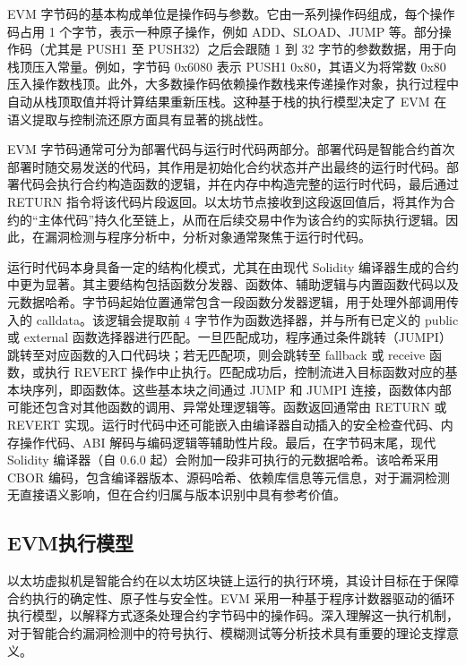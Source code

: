 \documentclass[print, master, vlined, timesmath]{DissertUESTC}
\begin{document}
EVM 字节码的基本构成单位是操作码与参数。它由一系列操作码组成，每个操作码占用 1 个字节，表示一种原子操作，例如 ADD、SLOAD、JUMP 等。部分操作码（尤其是 PUSH1 至 PUSH32）之后会跟随 1 到 32 字节的参数数据，用于向栈顶压入常量。例如，字节码 0x6080 表示 PUSH1 0x80，其语义为将常数 0x80 压入操作数栈顶。此外，大多数操作码依赖操作数栈来传递操作对象，执行过程中自动从栈顶取值并将计算结果重新压栈。这种基于栈的执行模型决定了 EVM 在语义提取与控制流还原方面具有显著的挑战性。

EVM 字节码通常可分为部署代码与运行时代码两部分\textsuperscript{\cite{albert2025secure}}。部署代码是智能合约首次部署时随交易发送的代码，其作用是初始化合约状态并产出最终的运行时代码。部署代码会执行合约构造函数的逻辑，并在内存中构造完整的运行时代码，最后通过 RETURN 指令将该代码片段返回。以太坊节点接收到这段返回值后，将其作为合约的“主体代码”持久化至链上，从而在后续交易中作为该合约的实际执行逻辑。因此，在漏洞检测与程序分析中，分析对象通常聚焦于运行时代码。

运行时代码本身具备一定的结构化模式，尤其在由现代 Solidity 编译器生成的合约中更为显著\textsuperscript{\cite{xiang2025automating}}。其主要结构包括函数分发器、函数体、辅助逻辑与内置函数代码以及元数据哈希。字节码起始位置通常包含一段函数分发器逻辑，用于处理外部调用传入的 calldata。该逻辑会提取前 4 字节作为函数选择器，并与所有已定义的 public 或 external 函数选择器进行匹配。一旦匹配成功，程序通过条件跳转（JUMPI）跳转至对应函数的入口代码块；若无匹配项，则会跳转至 fallback 或 receive 函数，或执行 REVERT 操作中止执行。匹配成功后，控制流进入目标函数对应的基本块序列，即函数体。这些基本块之间通过 JUMP 和 JUMPI 连接，函数体内部可能还包含对其他函数的调用、异常处理逻辑等。函数返回通常由 RETURN 或 REVERT 实现。运行时代码中还可能嵌入由编译器自动插入的安全检查代码、内存操作代码、ABI 解码与编码逻辑等辅助性片段\textsuperscript{\cite{li2024varlifter}}。最后，在字节码末尾，现代 Solidity 编译器（自 0.6.0 起）会附加一段非可执行的元数据哈希。该哈希采用 CBOR 编码，包含编译器版本、源码哈希、依赖库信息等元信息，对于漏洞检测无直接语义影响，但在合约归属与版本识别中具有参考价值。

\subsection{EVM执行模型}

以太坊虚拟机是智能合约在以太坊区块链上运行的执行环境，其设计目标在于保障合约执行的确定性、原子性与安全性\textsuperscript{\cite{fu2024evmfuzz}}。EVM 采用一种基于程序计数器驱动的循环执行模型，以解释方式逐条处理合约字节码中的操作码。深入理解这一执行机制，对于智能合约漏洞检测中的符号执行、模糊测试等分析技术具有重要的理论支撑意义。
\end{document}
